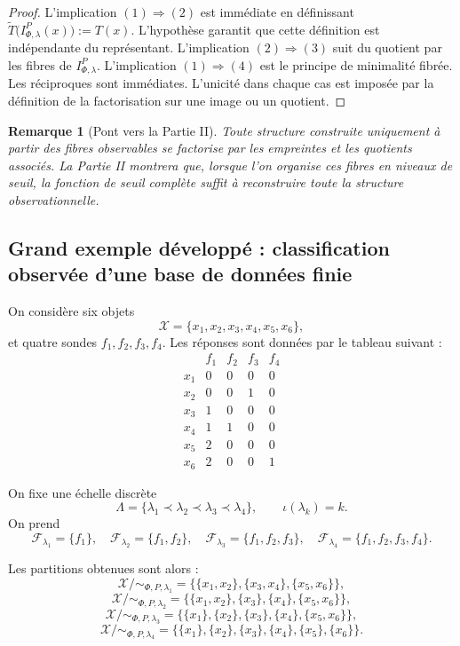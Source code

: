 \documentclass[11pt,a4paper]{article}
\newtheorem{remark}{Remarque}
\begin{document}
\begin{proof}
L'implication \((1)\Rightarrow(2)\) est immédiate en définissant \(\widetilde T\bigl(I_{\Phi,\lambda}^P(x)\bigr):=T(x)\). L'hypothèse garantit que cette définition est indépendante du représentant. L'implication \((2)\Rightarrow(3)\) suit du quotient par les fibres de \(I_{\Phi,\lambda}^P\). L'implication \((1)\Rightarrow(4)\) est le principe de minimalité fibrée. Les réciproques sont immédiates. L'unicité dans chaque cas est imposée par la définition de la factorisation sur une image ou un quotient.
\end{proof}

\begin{remark}[Pont vers la Partie II]
Toute structure construite uniquement à partir des fibres observables se factorise par les empreintes et les quotients associés. La Partie II montrera que, lorsque l'on organise ces fibres en niveaux de seuil, la fonction de seuil complète suffit à reconstruire toute la structure observationnelle.
\end{remark}

\subsection{Grand exemple développé : classification observée d'une base de données finie}

On considère six objets
\[
\mathcal X=\{x_1,x_2,x_3,x_4,x_5,x_6\},
\]
et quatre sondes \(f_1,f_2,f_3,f_4\). Les réponses sont données par le tableau suivant :
\[
\begin{array}{c|cccc}
& f_1 & f_2 & f_3 & f_4\\ \hline
x_1 & 0 & 0 & 0 & 0\\
x_2 & 0 & 0 & 1 & 0\\
x_3 & 1 & 0 & 0 & 0\\
x_4 & 1 & 1 & 0 & 0\\
x_5 & 2 & 0 & 0 & 0\\
x_6 & 2 & 0 & 0 & 1
\end{array}
\]

On fixe une échelle discrète
\[
\Lambda=\{\lambda_1\prec\lambda_2\prec\lambda_3\prec\lambda_4\},
\qquad
\iota(\lambda_k)=k.
\]
On prend
\[
\mathcal F_{\lambda_1}=\{f_1\},\quad
\mathcal F_{\lambda_2}=\{f_1,f_2\},\quad
\mathcal F_{\lambda_3}=\{f_1,f_2,f_3\},\quad
\mathcal F_{\lambda_4}=\{f_1,f_2,f_3,f_4\}.
\]

Les partitions obtenues sont alors :
\[
\mathcal X/{\sim_{\Phi,P,\lambda_1}}=
\bigl\{\{x_1,x_2\},\{x_3,x_4\},\{x_5,x_6\}\bigr\},
\]
\[
\mathcal X/{\sim_{\Phi,P,\lambda_2}}=
\bigl\{\{x_1,x_2\},\{x_3\},\{x_4\},\{x_5,x_6\}\bigr\},
\]
\[
\mathcal X/{\sim_{\Phi,P,\lambda_3}}=
\bigl\{\{x_1\},\{x_2\},\{x_3\},\{x_4\},\{x_5,x_6\}\bigr\},
\]
\[
\mathcal X/{\sim_{\Phi,P,\lambda_4}}=
\bigl\{\{x_1\},\{x_2\},\{x_3\},\{x_4\},\{x_5\},\{x_6\}\bigr\}.
\]
\end{document}

